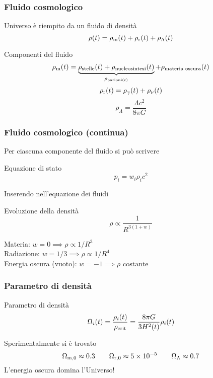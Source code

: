 \begin{frame}
  \frametitle{Fluido cosmologico}
  Universo è riempito da un fluido di densità
  \begin{equation*}
    \rho(t) = \rho_{\textup{m}}(t) + \rho_{\textup{r}}(t) + \rho_\Lambda(t)
  \end{equation*}
  \pause{}
  \begin{block}{Componenti del fluido}
    \begin{equation*}
      \rho_{\textup{m}}(t) =
      \underbrace{\rho_{\textup{stelle}}(t) +
        \rho_{\textup{nucleosintesi}}(t)}_{\rho_{\textup{barioni}(t)}} +
      \rho_{\textup{materia oscura}}(t)
    \end{equation*}
    \pause{}
    \begin{equation*}
      \rho_{\textup{r}}(t) = \rho_\gamma(t) + \rho_\nu(t)
    \end{equation*}
    \pause{}
    \begin{equation*}
      \rho_\Lambda = \frac{\Lambda c^2}{8\pi G}
    \end{equation*}
  \end{block}
\end{frame}

\begin{frame}
  \frametitle{Fluido cosmologico (continua)}
  Per ciascuna componente del fluido si può scrivere
  \begin{block}{Equazione di stato}
    \begin{equation*}
      p_i = w_i \rho_i c^2
    \end{equation*}
  \end{block}
  \pause{}
  Inserendo nell'equazione dei fluidi
  \begin{block}{Evoluzione della densità}
    \begin{equation*}
      \rho \propto \frac{1}{R^{3(1+w)}}
    \end{equation*}
  \end{block}
  \pause{}
  Materia: $w = 0 \implies \rho \propto 1/R^3$ \\
  \pause{}
  Radiazione: $w = 1/3 \implies \rho \propto 1/R^4$ \\
  \pause{}
  Energia oscura (vuoto): $w = -1 \implies \rho \text{ costante}$
\end{frame}

\begin{frame}
  \frametitle{Parametro di densità}
  \begin{block}{Parametro di densità}
    \begin{equation*}
      \Omega_i(t) = \frac{\rho_i(t)}{\rho_{\textup{crit}}} = \frac{8\pi
        G}{3H^2(t)}\rho_i(t)
    \end{equation*}
  \end{block}
  \pause{}
  Sperimentalmente si è trovato
  \begin{equation*}
    \Omega_{\textup{m},0} \approx \num{0.3} \qquad \Omega_{\textup{r},0} \approx
    \num{5e-5} \qquad \Omega_\Lambda \approx \num{0.7}
  \end{equation*}
  L'energia oscura domina l'Universo!
\end{frame}

